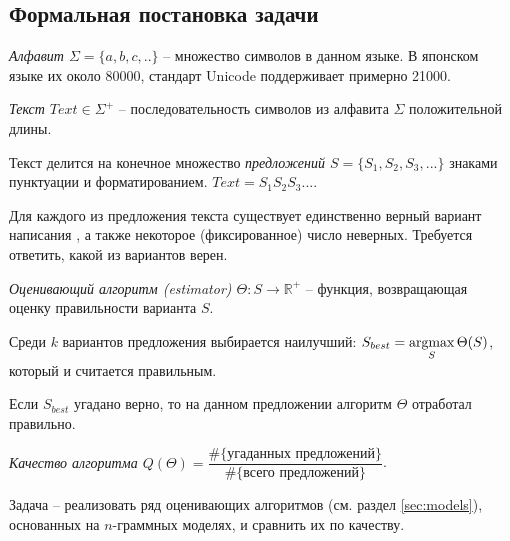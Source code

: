 \subsection{ Формальная постановка задачи }

\begin{definition}
	{\textit{Алфавит $\Sigma = \{ a, b, c, .. \}$}} -- множество символов в данном языке. В японском языке их около 80000, стандарт Unicode поддерживает примерно 21000.
\end{definition}

\begin{definition}
	{\textit{Текст $Text \in \Sigma^+$}} -- последовательность символов из алфавита $\Sigma$ положительной длины.
\end{definition}

\begin{definition}
	Текст делится на конечное множество {\textit{предложений $S = \{ S_1, S_2, S_3, ... \}$}} знаками пунктуации и форматированием. $Text = S_1S_2S_3...$.
\end{definition}

Для каждого из предложения текста существует единственно верный вариант написания , а также некоторое (фиксированное) число неверных. Требуется ответить, какой из вариантов верен.

\begin{definition}
	{\textit{Оценивающий алгоритм (estimator) $\Theta : S \rightarrow \mathbb{R}^+ $}} -- функция, возвращающая оценку правильности варианта $S$.
\end{definition}

Среди $k$ вариантов предложения выбирается наилучший: $S_{best} = \operatorname*{argmax}\limits_{S} \Theta(S)$, который и считается правильным.

Если $S_{best}$ угадано верно, то на данном предложении алгоритм $\Theta$ отработал правильно.

\begin{definition}
	{\textit{Качество алгоритма $Q(\Theta) = \dfrac{\#\{ \text{угаданных предложений} \}}{\#\{ \text{всего предложений} \}}$}}.
\end{definition}

Задача -- реализовать ряд оценивающих алгоритмов (см. раздел \cref{sec:models}), основанных на $n$-граммных моделях, и сравнить их по качеству.